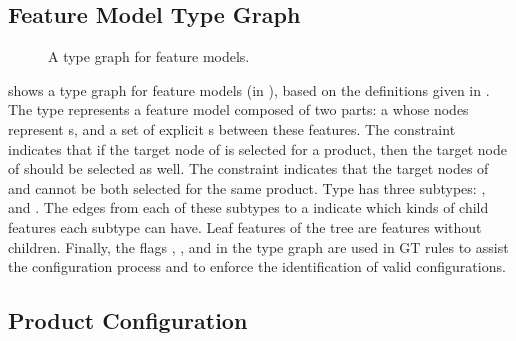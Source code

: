 


\subsection{Feature Model Type Graph}

\begin{figure}[tb]
\centering
{}
\caption{A type graph for feature models.}
\end{figure}

 shows a type graph for feature models (in \GROOVE), based on
the definitions given in \cite{Broek2009}. The type 
represents a feature model composed of two parts: a  whose
nodes represent s, and a set of explicit s
between these features. The constraint  indicates that if the
target node of  is selected for a product, then the target node of
 should be selected as well. The constraint 
indicates that the target nodes of  and  cannot be
both selected for the same product.
Type  has three subtypes: ,  and
. The edges from each of these subtypes to a  indicate
which kinds of child features each subtype can have. Leaf features of the tree are  features without children.
Finally, the flags , , and  in
the type graph are used in GT rules to assist the configuration process and to
enforce the identification of valid configurations.

\subsection{Product Configuration}

